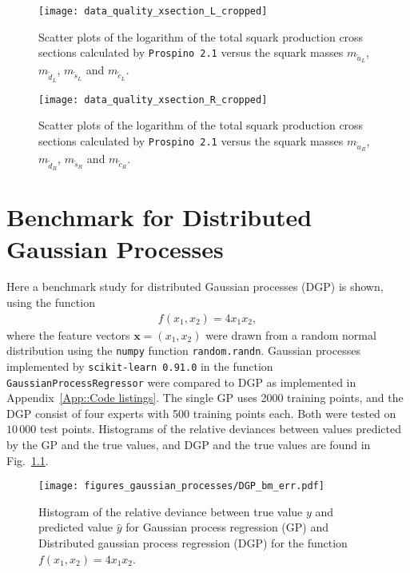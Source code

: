 \documentclass[twoside,english]{uiofysmaster}
\begin{document}
{{\begin{appendices}
\begin{figure}[H]
    \centering
        \texttt{[image: data\_quality\_xsection\_L\_cropped]}
    \caption{Scatter plots of the logarithm of the total squark production cross sections calculated by {\tt Prospino 2.1} versus the squark masses $m_{\widetilde{u}_L}$, $m_{\widetilde{d}_L}$, $m_{\widetilde{s}_L}$ and $m_{\widetilde{c}_L}$.}
\label{Fig:: App : Data quality xsection plots}
\end{figure}

\begin{figure}[H]
    \centering
        \texttt{[image: data\_quality\_xsection\_R\_cropped]}
    \caption{Scatter plots of the logarithm of the total squark production cross sections calculated by {\tt Prospino 2.1} versus the squark masses $m_{\widetilde{u}_R}$, $m_{\widetilde{d}_R}$, $m_{\widetilde{s}_R}$ and $m_{\widetilde{c}_R}$.}
\label{Fig:: App : Data quality xsection plots}
\end{figure}



\chapter{Benchmark for Distributed Gaussian Processes}\label{App:DGP Benchmark}

Here a benchmark study for distributed Gaussian processes (DGP) is shown, using the function
\begin{align*}
f(x_1, x_2) =  4x_1x_2,
\end{align*}
where the feature vectors $\textbf{x} = (x_1, x_2)$ were drawn from a random normal distribution using the \verb|numpy| function \verb|random.randn|. Gaussian processes implemented by \verb|scikit-learn 0.91.0| in the function \verb|GaussianProcessRegressor| were compared to DGP as implemented in Appendix~\ref{App::Code listings}. The single GP uses 2000 training points, and the DGP consist of four experts with 500 training points each. Both were tested on $10\,000$ test points. Histograms of the relative deviances between values predicted by the GP and the true values, and DGP and the true values are found in Fig.~\ref{Fig:: gaussian process : DGP BM error histogram}.

\begin{figure}
\centering
\texttt{[image: figures\_gaussian\_processes/DGP\_bm\_err.pdf]}
\caption{Histogram of the relative deviance between true value $y$ and predicted value $\hat{y}$ for Gaussian process regression (GP) and Distributed gaussian process regression (DGP) for the function $f(x_1,x_2) = 4x_1 x_2$.}
\label{Fig:: gaussian process : DGP BM error histogram}
\end{figure}


\end{appendices}}}
\end{document}
